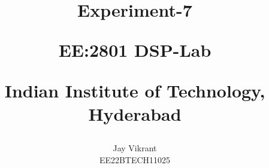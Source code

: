\documentclass[journal,12pt,onecolumn]{IEEEtran}
\theoremstyle{remark}
\begin{document}
%




\vspace{3cm}

\title{
Experiment-7

\large{EE:2801 DSP-Lab}

Indian Institute of Technology, Hyderabad
}
\author{Jay Vikrant

EE22BTECH11025
}	


%
%
%

% 
%



% 
\end{document}
